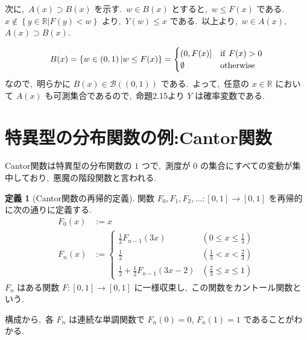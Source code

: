 \documentclass[a4j,11pt]{jarticle}
\theoremstyle{definition}
\newtheorem{definition}[theorem]{定義}
\begin{document}
次に,\ 
$A(x) \supset B(x)$
を示す.\ 
$w \in B(x)$
とすると,\ 
$w \leq F(x)$
である.\ 
$x \not\in \left\{ y \in \mathbb{R} | F(y) < w\right\}$
より,\ 
$Y(w) \leq x$
である.\ 
以上より,\ 
$w \in A(x),\ $
$A(x) \supset B(x)$.\ 

\begin{equation}
  B(x) = \left\{ w  \in\left( 0,1\right) | w \leq F(x)\right\} = 
  \begin{cases}
    \left( 0, F(x)\right] & {\rm if } \ F(x) > 0 \\
    \emptyset & {\rm otherwise}
  \end{cases}
\end{equation}
なので,\ 明らかに
$B(x) \in \mathcal{B}((0,1))$
である.\ 
よって,\ 任意の
$x\in \mathbb{R}$
において
$A(x)$
も可測集合であるので,\ 命題2.15より
$Y$
は確率変数である.\ 


\section{特異型の分布関数の例:Cantor関数}
Cantor関数は特異型の分布関数の
$1$
つで,\ 測度が
$0$
の集合にすべての変動が集中しており,\ 悪魔の階段関数と言われる.\ 

\begin{definition}[Cantor関数の再帰的定義]
  関数
  $F_0,F_1,F_2,\ldots:[0,1]\to[0,1]$
  を再帰的に次の通りに定義する.\ 
  \begin{align}
    F_0(x)
    & := x\\
    F_n(x)
    & :=
    \begin{cases}
      \frac{1}{2}F_{n-1}(3x) & \left(0 \leq x \leq \frac{1}{3}\right) \\
      \frac{1}{2} & \left( \frac{1}{3} < x < \frac{2}{3}\right) \\
      \frac{1}{2} + \frac{1}{2}F_{n-1}(3x-2) & \left( \frac{2}{3} \leq x \leq 1\right)
    \end{cases}
  \end{align}
  $F_n$
  はある関数
  $F:[0,1]\to[0,1]$
  に一様収束し,\ この関数をカントール関数という.\ 
\end{definition}

構成から,\ 各
$F_n$
は連続な単調関数で
$F_n(0) = 0$,
$F_n(1) = 1$
であることがわかる.\ 
\end{document}
